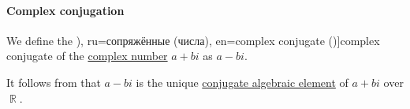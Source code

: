 \paragraph{Complex conjugation}

\begin{definition}\label{def:complex_conjugation}
  We define the \term[bg=(комплексно) спрегнато (число) (\cite[298]{ИлинСадовничиСендов1984АнализТом1}), ru=сопряжённые (числа), en=complex conjugate (\cite[7]{Ahlfors1979ComplexAnalysis})]{complex conjugate} of the \hyperref[def:complex_numbers]{complex number} \( a + bi \) as \( a - bi \).
\end{definition}
\begin{comments}
  \item It follows from  that \( a - bi \) is the unique \hyperref[def:conjugate_algebraic_element]{conjugate algebraic element} of \( a + bi \) over \( \BbbR \).
\end{comments}


